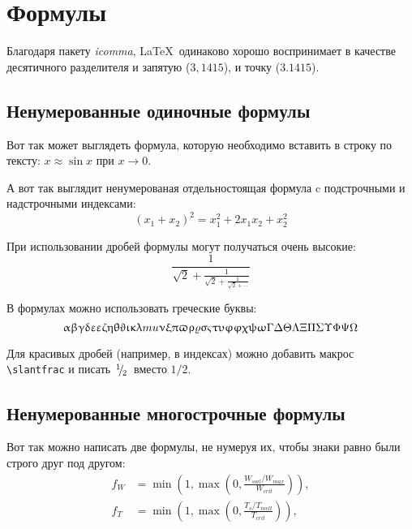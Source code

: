 
\section{Формулы} \label{sect1_3}

Благодаря пакету \textit{icomma}, \LaTeX~одинаково хорошо воспринимает в качестве десятичного разделителя и запятую ($3,1415$), и точку ($3.1415$).

\subsection{Ненумерованные одиночные формулы} \label{subsect1_3_1}

Вот так может выглядеть формула, которую необходимо вставить в строку по тексту: $x \approx \sin x$ при $x \to 0$.

А вот так выглядит ненумерованая отдельностоящая формула c подстрочными и надстрочными индексами:
\[
(x_1+x_2)^2 = x_1^2 + 2 x_1 x_2 + x_2^2
\]

При использовании дробей формулы могут получаться очень высокие:
\[
  \frac{1}{\sqrt{2}+
  \displaystyle\frac{1}{\sqrt{2}+
  \displaystyle\frac{1}{\sqrt{2}+\cdots}}}
\]

В формулах можно использовать греческие буквы:
\[
\alpha\beta\gamma\delta\epsilon\varepsilon\zeta\eta\theta\vartheta\iota\kappa\lambda\\mu\nu\xi\pi\varpi\rho\varrho\sigma\varsigma\tau\upsilon\phi\varphi\chi\psi\omega\Gamma\Delta\Theta\Lambda\Xi\Pi\Sigma\Upsilon\Phi\Psi\Omega
\]


Для красивых дробей (например, в индексах) можно добавить макрос
\verb+\slantfrac+ и писать $\slantfrac{1}{2}$ вместо $1/2$.

\subsection{Ненумерованные многострочные формулы} \label{subsect1_3_2}

Вот так можно написать две формулы, не нумеруя их, чтобы знаки равно были строго друг под другом:
\begin{align}
  f_W & =  \min \left( 1, \max \left( 0, \frac{W_{soil} / W_{max}}{W_{crit}} \right)  \right), \nonumber \\
  f_T & =  \min \left( 1, \max \left( 0, \frac{T_s / T_{melt}}{T_{crit}} \right)  \right), \nonumber
\end{align}

